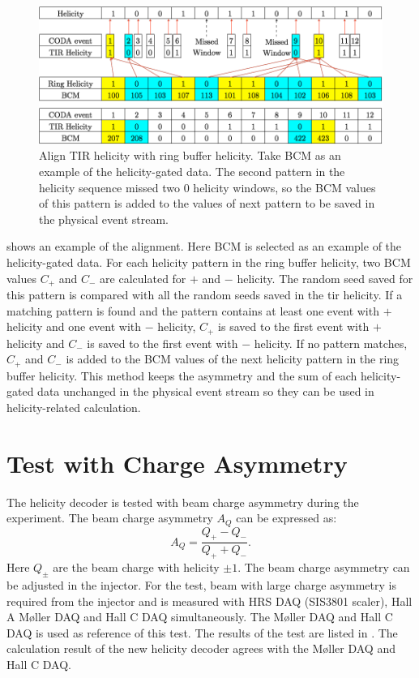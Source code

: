 \begin{figure}[b!]
  \centering
  \includegraphics[width=\textwidth]{figs/helicity-align.png}
  \caption[Align TIR helicity with ring buffer helicity.]{Align TIR helicity with ring buffer helicity. Take BCM as an example of the helicity-gated data. The second pattern in the helicity sequence missed two 0 helicity windows, so the BCM values of this pattern is added to the values of next pattern to be saved in the physical event stream. \label{A2S2F7} }
\end{figure}

 shows an example of the alignment. Here BCM is selected as an example of the helicity-gated data. For each helicity pattern in the ring buffer helicity, two BCM values $C_{+}$ and $C_{-}$ are calculated for $+$ and $-$ helicity. The random seed saved for this pattern is compared with all the random seeds saved in the tir helicity. If a matching pattern is found and the pattern contains at least one event with $+$ helicity and one event with $-$ helicity, $C_{+}$ is saved to the first event with $+$ helicity and $C_{-}$ is saved to the first event with $-$ helicity. If no pattern matches, $C_{+}$ and $C_{-}$ is added to the BCM values of the next helicity pattern in the ring buffer helicity. This method keeps the asymmetry and the sum of each helicity-gated data unchanged in the physical event stream so they can be used in helicity-related calculation.

\section{Test with Charge Asymmetry}
\label{A2S3}

The helicity decoder is tested with beam charge asymmetry during the experiment. The beam charge asymmetry $A_{Q}$ can be expressed as:
\begin{equation} \label{A2S3E1}
A_{Q}=\frac{Q_{+}-Q_{-}}{Q_{+}+Q_{-}}.
\end{equation}
Here $Q_{\pm}$ are the beam charge with helicity $\pm 1$. The beam charge asymmetry can be adjusted in the injector. For the test, beam with large charge asymmetry is required from the injector and is measured with HRS DAQ (SIS3801 scaler), Hall A M{\o}ller DAQ and Hall C DAQ simultaneously. The M{\o}ller DAQ and Hall C DAQ is used as reference of this test. The results of the test are listed in . The calculation result of the new helicity decoder agrees with the M{\o}ller DAQ and Hall C DAQ.

